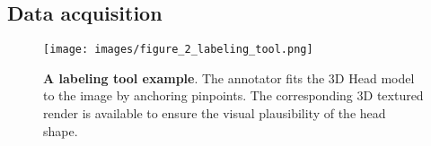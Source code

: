 \documentclass[10pt,twocolumn,letterpaper]{article}
\begin{document}
\begin{comment}
Creating a large-scale dataset with consistent 3D Dense Head Alignment annotations is a highly non-trivial, labor-intensive, and ambiguous problem. 
Creating ground truth labels for 2D images requires using specific equipment which doesn't scale to real-world problems. 
Without using specific equipment or sensors, human annotators can not label the depth or -coordinate for the image. 
The manual labeling of 2D landmarks on large-pose faces is tedious since the occluded landmarks have to be "guessed", which is impossible for most people. 
As a result, most available datasets and benchmarks contain images in medium poses or annotate only visible landmarks for side and mid poses. 
Most datasets also divide landmarks into static (eyes, nose, lips) and dynamic - visible jaw boundary to simplify the labeling task and increase the consistency of the labels. 
This adds profound ambiguity to the 3D head reconstruction from 2D landmarks as the visible landmarks are not consistent with the 3D head model. 
As an experiment of labeling consistency, we let ten different annotators label an image of 45 yaws for both visible and 3D consistent landmarks (result in a figure). 
The average consistency - [number here, expected to be low].
\end{comment}

\subsection{Data acquisition}\label{ssec:labeling}

\begin{figure}[htp!]\centering
\texttt{[image: images/figure\_2\_labeling\_tool.png]}
\caption{\textbf{A labeling tool example}. The annotator fits the 3D Head model to the image by anchoring pinpoints. 
The corresponding 3D textured render is available to ensure the visual plausibility of the head shape.}
  \vspace{-1em}
  \label{fig:labeling_tool}
\end{figure}
\end{document}

